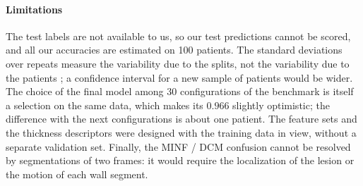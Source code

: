 \paragraph{Limitations}
The test labels are not available to us, so our test predictions cannot be scored, and all our accuracies are estimated on 100 patients. The standard deviations over repeats measure the variability due to the splits, not the variability due to the patients \citep{nadeau2003}; a confidence interval for a new sample of patients would be wider. The choice of the final model among 30 configurations of the benchmark is itself a selection on the same data, which makes its $0.966$ slightly optimistic; the difference with the next configurations is about one patient. The feature sets and the thickness descriptors were designed with the training data in view, without a separate validation set. Finally, the MINF / DCM confusion cannot be resolved by segmentations of two frames: it would require the localization of the lesion or the motion of each wall segment.
